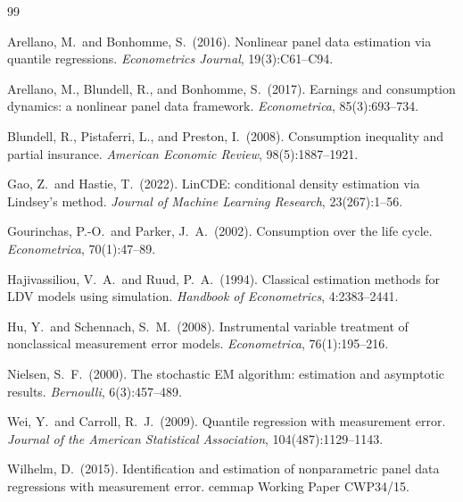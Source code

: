 \documentclass[12pt]{article}
\begin{document}
\bigskip

\begin{thebibliography}{99}

Arellano, M.\ and Bonhomme, S.\ (2016).
Nonlinear panel data estimation via quantile regressions.
\textit{Econometrics Journal}, 19(3):C61--C94.

Arellano, M., Blundell, R., and Bonhomme, S.\ (2017).
Earnings and consumption dynamics: a nonlinear panel data framework.
\textit{Econometrica}, 85(3):693--734.

Blundell, R., Pistaferri, L., and Preston, I.\ (2008).
Consumption inequality and partial insurance.
\textit{American Economic Review}, 98(5):1887--1921.

Gao, Z.\ and Hastie, T.\ (2022).
LinCDE: conditional density estimation via Lindsey's method.
\textit{Journal of Machine Learning Research}, 23(267):1--56.

Gourinchas, P.-O.\ and Parker, J.\ A.\ (2002).
Consumption over the life cycle.
\textit{Econometrica}, 70(1):47--89.

Hajivassiliou, V.\ A.\ and Ruud, P.\ A.\ (1994).
Classical estimation methods for LDV models using simulation.
\textit{Handbook of Econometrics}, 4:2383--2441.

Hu, Y.\ and Schennach, S.\ M.\ (2008).
Instrumental variable treatment of nonclassical measurement error models.
\textit{Econometrica}, 76(1):195--216.

Nielsen, S.\ F.\ (2000).
The stochastic EM algorithm: estimation and asymptotic results.
\textit{Bernoulli}, 6(3):457--489.

Wei, Y.\ and Carroll, R.\ J.\ (2009).
Quantile regression with measurement error.
\textit{Journal of the American Statistical Association}, 104(487):1129--1143.

Wilhelm, D.\ (2015).
Identification and estimation of nonparametric panel data regressions with
measurement error.
cemmap Working Paper CWP34/15.

\end{thebibliography}

\appendix
\end{document}
